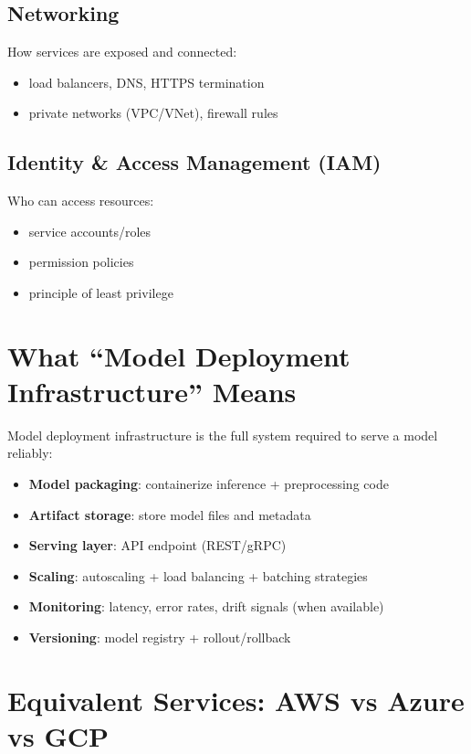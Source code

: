 \documentclass[11pt]{article}
\begin{document}
\subsection{Networking}
How services are exposed and connected:
\begin{itemize}
  \item load balancers, DNS, HTTPS termination
  \item private networks (VPC/VNet), firewall rules
\end{itemize}

\subsection{Identity \& Access Management (IAM)}
Who can access resources:
\begin{itemize}
  \item service accounts/roles
  \item permission policies
  \item principle of least privilege
\end{itemize}

\section{What ``Model Deployment Infrastructure'' Means}
Model deployment infrastructure is the full system required to serve a model reliably:
\begin{itemize}
  \item \textbf{Model packaging}: containerize inference + preprocessing code
  \item \textbf{Artifact storage}: store model files and metadata
  \item \textbf{Serving layer}: API endpoint (REST/gRPC)
  \item \textbf{Scaling}: autoscaling + load balancing + batching strategies
  \item \textbf{Monitoring}: latency, error rates, drift signals (when available)
  \item \textbf{Versioning}: model registry + rollout/rollback
\end{itemize}

\section{Equivalent Services: AWS vs Azure vs GCP}
\end{document}
